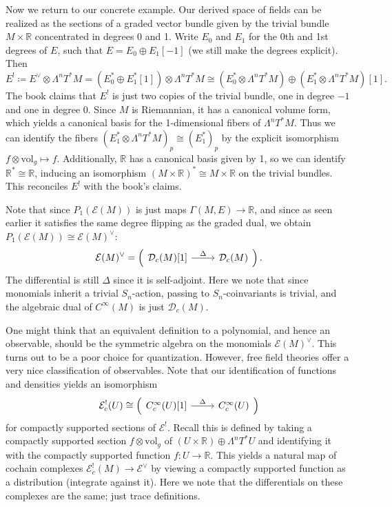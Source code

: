 \begin{example}
Now we return to our concrete example. Our derived space of fields can be realized as the sections of a graded vector bundle given by the trivial bundle $M\times \mathbb{R} $ concentrated in degrees 0 and 1. Write $E_0$ and $E_1$ for the 0th and 1st degrees of $E$, such that $E = E_0 \oplus E_1[-1]$ (we still make the degrees explicit). Then
\[
	E^! \coloneqq E^\vee \otimes \Lambda ^nT^*M = (E_0^* \oplus E_1^*[1])\otimes \Lambda ^nT^*M \cong (E_0^* \otimes \Lambda ^nT^*M) \oplus (E_1^* \otimes \Lambda ^nT^*M)[1]
.\]
The book claims that $E^!$ is just two copies of the trivial bundle, one in degree $-1$ and one in degree 0. Since $M$ is Riemannian, it has a canonical volume form, which yields a canonical basis for the 1-dimensional fibers of $\Lambda ^nT^*M$. Thus we can identify the fibers $(E_1^* \otimes \Lambda ^nT^*M)_p \cong (E_1^*)_p$ by the explicit isomorphism $f\otimes \mathrm{vol} _g \mapsto f$. Additionally, $\mathbb{R} $ has a canonical basis given by 1, so we can identify $\mathbb{R} ^*\cong \mathbb{R} $, inducing an isomorphism $(M\times \mathbb{R} )^* \cong M\times \mathbb{R} $ on the trivial bundles. This reconciles $E^!$ with the book's claims.

Note that since $P_1(\mathcal{E} (M))$ is just maps $\Gamma (M,E)\to \mathbb{R} $, and since as seen earlier it satisfies the same degree flipping as the graded dual, we obtain $P_1(\mathcal{E} (M))\cong \mathcal{E} (M)^\vee $:
\[
	\mathcal{E} (M)^\vee = \left( 
		\begin{tikzcd}
			\mathcal{D} _c(M)[1] \ar[" \Delta  ", r] & \mathcal{D} _c(M)
		\end{tikzcd}
	\right) 
.\]
The differential is still $\Delta $ since it is self-adjoint. Here we note that since monomials inherit a trivial $S_n$-action, passing to $S_n$-coinvariants is trivial, and the algebraic dual of $C^\infty (M)$ is just $\mathcal{D} _c(M)$.

One might think that an equivalent definition to a polynomial, and hence an observable, should be the symmetric algebra on the monomials $\mathcal{E} (M)^\vee $. This turns out to be a poor choice for quantization. However, free field theories offer a very nice classification of observables. Note that our identification of functions and densities yields an isomorphism
\[
	\mathcal{E}_c ^! (U)\cong \left( 
		\begin{tikzcd}
			C^\infty _c(U)[1]\ar[" \Delta  ", r] & C^\infty _c(U)
		\end{tikzcd}
	\right) 
\]
for compactly supported sections of $\mathcal{E} ^!$. Recall this is defined by taking a compactly supported section $f\otimes \mathrm{vol} _g$ of $(U\times \mathbb{R} )\oplus \Lambda ^nT^*U$ and identifying it with the compactly supported function $f : U \to \mathbb{R} $. This yields a natural map of cochain complexes  $\mathcal{E} ^!_c(M)\to \mathcal{E}^\vee $ by viewing a compactly supported function as a distribution (integrate against it). Here we note that the differentials on these complexes are the same; just trace definitions.


\end{example}
